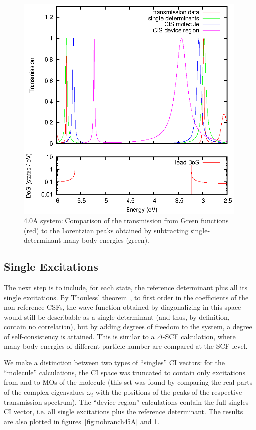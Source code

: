 \begin{figure}[h]
	\begin{center}
		\includegraphics[width=0.9\linewidth]{figures/nobrsingles40A.eps}
	\end{center}
	\caption{4.0A system: Comparison of the transmission from Green
                 functions (red) to the Lorentzian peaks obtained by
                 subtracting single-determinant many-body energies (green).}
	\label{fig:nobranch40A}
\end{figure}

\subsection{Single Excitations}
\label{subsec:singles}

The next step is to include, for each state, the reference determinant plus all
its single excitations. By Thouless' theorem~\cite{Thouless}, to first order in
the coefficients of the non-reference \acp{CSF}, the wave function obtained by
diagonalizing in this space would still be describable as a single determinant
(and thus, by definition, contain no correlation), but by adding degrees of
freedom to the system, a degree of self-consistency is attained. This is similar
to a $\Delta$-SCF calculation, where many-body energies of different particle
number are compared at the SCF level.

We make a distinction between two types of ``singles'' \ac{CI} vectors: for the
``molecule'' calculations, the \ac{CI} space was truncated to contain only
excitations from and to MOs of the molecule (this set was found by comparing
the real parts of the complex eigenvalues $\omega_i$ with the positions of the
peaks of the respective transmission spectrum). The ``device region''
calculations contain the full singles \ac{CI} vector, i.e. all single
excitations plus the reference determinant. The results are also plotted in
figures~\ref{fig:nobranch45A} and \ref{fig:nobranch40A}.

